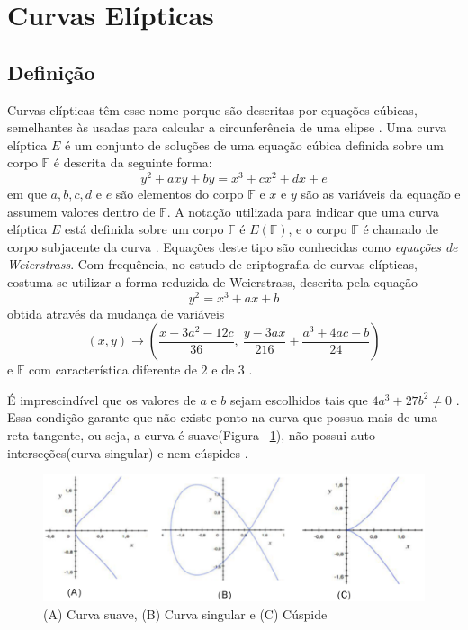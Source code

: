 %
%
\section{Curvas Elípticas}

%
%
\subsection{Definição}
Curvas elípticas têm esse nome porque são descritas por equações cúbicas, semelhantes às usadas para calcular a circunferência de uma elipse \cite{Stallings:2011}. Uma curva elíptica \(E\) é um conjunto de soluções de uma equação cúbica definida sobre um corpo \(\mathbb{F}\) é descrita da seguinte forma:
\begin{equation}
y^2 + axy + by = x^3 + cx^2 + dx + e \label{eq:5}
\end{equation}
em que \(a, b, c, d\) e \(e\) são elementos do corpo \(\mathbb{F}\) e \(x\) e \(y\) são as variáveis da equação e assumem valores dentro de \(\mathbb{F}\). A notação utilizada para indicar que uma curva elíptica \(E\) está definida sobre um corpo \(\mathbb{F}\) é $E(\mathbb{F})$, e o corpo \(\mathbb{F}\) é chamado de corpo subjacente da curva \cite{Guide}. Equações deste tipo são conhecidas como \textit{equações de Weierstrass}. Com frequência, no estudo de criptografia de curvas elípticas, costuma-se utilizar a forma reduzida de Weierstrass, descrita pela equação
\begin{equation}
y^2 = x^3 + ax + b \label{eq:6}
\end{equation}
obtida através da mudança de variáveis
\begin{equation}
  (x, y) \rightarrow \left(\frac{x - 3a^2 - 12c}{36},\ \frac{y - 3ax}{216} + \frac{a^3 + 4ac - b}{24}\right)
\end{equation}
e \(\mathbb{F}\) com característica diferente de \(2\) e de \(3\) \cite{Guide}.

É imprescindível que os valores de \(a\) e \(b\) sejam escolhidos tais que $4a^3 + 27b^2 \ne 0$ \cite{Mandy:2007}. Essa condição garante que não existe ponto na curva que possua mais de uma reta tangente, ou seja, a curva é suave(Figura ~\ref{fig:cuspide}), não possui auto-interseções(curva singular) e nem cúspides \cite{Guide}.
\begin{figure}
\includegraphics[scale=0.6, bb=0 0 515 478]{figuras/curva_suave_singular_cuspide.eps}
\caption{(A) Curva suave, (B) Curva singular e (C) Cúspide}
\label{fig:cuspide}
\end{figure}

